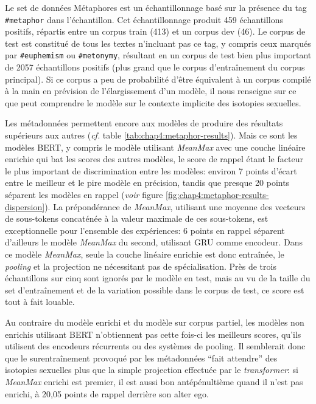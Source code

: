 Le set de données Métaphores est un échantillonnage basé sur la présence du tag \texttt{\#metaphor} dans l'échantillon. Cet échantillonnage produit 459 échantillons positifs, répartis entre un corpus train (413) et un corpus dev (46). Le corpus de test est constitué de tous les textes n'incluant pas ce tag, y compris ceux marqués par \texttt{\#euphemism} ou \texttt{\#metonymy}, résultant en un corpus de test bien plus important de 2057 échantillons positifs (plus grand que le corpus d'entraînement du corpus principal). Si ce corpus a peu de probabilité d'être équivalent à un corpus compilé à la main en prévision de l'élargissement d'un modèle, il nous renseigne sur ce que peut comprendre le modèle sur le contexte implicite des isotopies sexuelles.

Les métadonnées permettent encore aux modèles de produire des résultats supérieurs aux autres (\textit{cf.} table \ref{tab:chap4:metaphor-results}). Mais ce sont les modèles BERT, y compris le modèle utilisant \textit{MeanMax} avec une couche linéaire enrichie qui bat les scores des autres modèles, le score de rappel étant le facteur le plus important de discrimination entre les modèles: environ 7 points d'écart entre le meilleur et le pire modèle en précision, tandis que presque 20 points séparent les modèles en rappel (\textit{voir} figure \ref{fig:chap4:metaphor-results-dispersion}). La prépondérance de \textit{MeanMax}, utilisant une moyenne des vecteurs de sous-tokens concaténée à la valeur maximale de ces sous-tokens, est exceptionnelle pour l'ensemble des expériences: 6 points en rappel séparent d'ailleurs le modèle \textit{MeanMax} du second, utilisant GRU comme encodeur. Dans ce modèle \textit{MeanMax}, seule la couche linéaire enrichie est donc entraînée, le \textit{pooling} et la projection ne nécessitant pas de spécialisation. Près de trois échantillons sur cinq sont ignorés par le modèle en test, mais au vu de la taille du set d'entraînement et de la variation possible dans le corpus de test, ce score est tout à fait louable.

Au contraire du modèle enrichi et du modèle sur corpus partiel, les modèles non enrichis utilisant BERT n'obtiennent pas cette fois-ci les meilleurs scores, qu'ils utilisent des encodeurs récurrents ou des systèmes de pooling. Il semblerait donc que le surentraînement provoqué par les métadonnées \enquote{fait attendre} des isotopies sexuelles plus que la simple projection effectuée par le \textit{transformer}: si \textit{MeanMax} enrichi est premier, il est aussi bon antépénultième quand il n'est pas enrichi, à 20,05 points de rappel derrière son alter ego.

